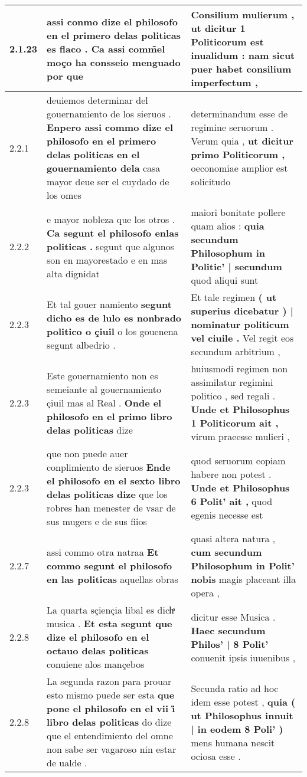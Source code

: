\begin{tabular}{|p{1cm}|p{6.5cm}|p{6.5cm}|}
2.1.23 & assi conmo dize el philosofo \textbf{ en el primero delas politicas es flaco . } Ca assi comm̃el moço ha consseio menguado por que & Consilium mulierum , \textbf{ ut dicitur 1 Politicorum est inualidum : } nam sicut puer habet consilium imperfectum , \\\hline
2.2.1 & deuiemos determinar del gouernamiento de los sieruos . \textbf{ Enpero assi commo dize el philosofo en el primero delas politicas en el gouernamiento dela } casa mayor deue ser el cuydado de los omes & determinandum esse de regimine seruorum . Verum quia , \textbf{ ut dicitur primo Politicorum , } oeconomiae amplior est solicitudo \\\hline
2.2.2 & e mayor nobleza que los otros . \textbf{ Ca segunt el philosofo enlas politicas . } segunt que algunos son en mayorestado e en mas alta dignidat & maiori bonitate pollere quam alios : \textbf{ quia secundum Philosophum in Politic’ | secundum } quod aliqui sunt \\\hline
2.2.3 & Et tal gouer namiento \textbf{ segunt dicho es de lulo es nonbrado politico o çiuil } o los gouenena segunt albedrio . & Et tale regimen \textbf{ ( ut superius dicebatur ) | nominatur politicum vel ciuile . } Vel regit eos secundum arbitrium , \\\hline
2.2.3 & Este gouernamiento non es semeiante al gouernamiento çiuil mas al Real . \textbf{ Onde el philosofo en el primo libro delas politicas } dize & huiusmodi regimen non assimilatur regimini politico , sed regali . \textbf{ Unde et Philosophus 1 Politicorum ait , } virum praeesse mulieri , \\\hline
2.2.3 & que non puede auer conplimiento de sieruos \textbf{ Ende el philosofo en el sexto libro delas politicas dize } que los robres han menester de vsar de sus mugers e de sus fiios & quod seruorum copiam habere non potest . \textbf{ Unde et Philosophus 6 Polit’ ait , } quod egenis necesse est \\\hline
2.2.7 & assi commo otra natraa \textbf{ Et commo segunt el philosofo en las politicas } aquellas obras & quasi altera natura , \textbf{ cum secundum Philosophum in Polit’ nobis } magis placeant illa opera , \\\hline
2.2.8 & La quarta sçiençia libal es dichͣ musica . \textbf{ Et esta segunt que dize el philosofo en el octauo delas politicas } conuiene alos mançebos & dicitur esse Musica . \textbf{ Haec secundum Philos’ | 8 Polit’ } conuenit ipsis iuuenibus , \\\hline
2.2.8 & La segunda razon para prouar esto mismo puede ser esta \textbf{ que pone el philosofo en el vii i̊ libro delas politicas } do dize que el entendimiento del omne non sabe ser vagaroso nin estar de ualde . & Secunda ratio ad hoc idem esse potest , \textbf{ quia ( ut Philosophus innuit | in eodem 8 Poli’ ) } mens humana nescit ociosa esse . \\\hline

\end{tabular}
